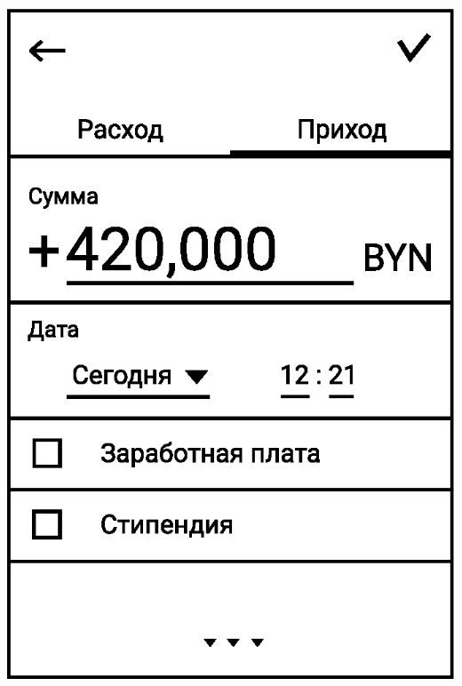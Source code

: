 \documentclass[russian,utf8,a1paper,nostitching,simple]{eskdgraph}
\begin{document}
\begin{ESKDdrawing}
\begin{minipage}{17cm}
\begin{minipage}{7.5cm}
      \vspace{1cm}
      \centering
      \includegraphics[width=\linewidth]{fig/ui_activities_input_income_text.eps}


\end{minipage}
\end{minipage}
\end{ESKDdrawing}
\end{document}
